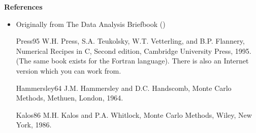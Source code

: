 \documentclass{article}
\begin{document}
{\bf References}

\begin{itemize}
\item Originally from The Data Analysis Briefbook
()
\end{itemize}

\begin{itemize}
\item [Press95] W.H. Press, S.A. Teukolsky, W.T. Vetterling, and B.P. Flannery, Numerical Recipes in C, Second edition, Cambridge University Press, 1995. (The same book exists for the Fortran language). There is also an Internet version which you can work from.
\item[Hammersley64] J.M. Hammersley and D.C. Handscomb, Monte Carlo Methods, Methuen, London, 1964.
\item[Kalos86] M.H. Kalos and P.A. Whitlock, Monte Carlo Methods, Wiley, New York, 1986.
\end{itemize}
\end{document}
